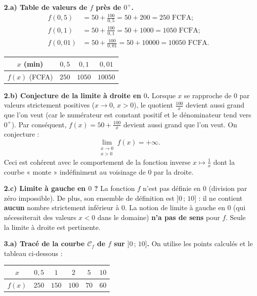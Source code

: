 \documentclass[11pt]{article}
\begin{document}
\begin{exoresolu}
\textbf{2.a) Table de valeurs de $f$ près de $0^+$.}
\begin{align*}
f(0{,}5) &= 50 + \frac{100}{0{,}5} = 50 + 200 = 250 \text{ FCFA} ;\\
f(0{,}1) &= 50 + \frac{100}{0{,}1} = 50 + 1000 = 1050 \text{ FCFA} ;\\
f(0{,}01) &= 50 + \frac{100}{0{,}01} = 50 + 10000 = 10050 \text{ FCFA}.
\end{align*}
\begin{center}
\begin{tabular}{|c|ccc|}\hline
\rowcolor{popblueL} $x$ (min) & $0{,}5$ & $0{,}1$ & $0{,}01$ \\ \hline
$f(x)$ (FCFA) & $250$ & $1050$ & $10050$ \\ \hline
\end{tabular}
\end{center}

\textbf{2.b) Conjecture de la limite à droite en $0$.}
Lorsque $x$ se rapproche de $0$ par valeurs strictement positives ($x \to 0$, $x>0$), le quotient $\frac{100}{x}$ devient aussi grand que l'on veut (car le numérateur est constant positif et le dénominateur tend vers $0^+$). Par conséquent, $f(x) = 50 + \frac{100}{x}$ devient aussi grand que l'on veut. On conjecture :
\[ \lim\limits_{\substack{x \to 0 \\ x > 0}} f(x) = +\infty. \]
Ceci est cohérent avec le comportement de la fonction inverse $x \mapsto \frac{1}{x}$ dont la courbe « monte » indéfiniment au voisinage de $0$ par la droite.

\textbf{2.c) Limite à gauche en $0$ ?}
La fonction $f$ n'est pas définie en $0$ (division par zéro impossible). De plus, son ensemble de définition est $]0\,;\,10]$ : il ne contient \textbf{aucun} nombre strictement inférieur à $0$. La notion de limite à gauche en $0$ (qui nécessiterait des valeurs $x<0$ dans le domaine) \textbf{n'a pas de sens} pour $f$. Seule la limite à droite est pertinente.

\textbf{3.a) Tracé de la courbe $\mathcal{C}_f$ de $f$ sur $]0\,;\,10]$.}
On utilise les points calculés et le tableau ci-dessous :
\begin{center}
\begin{tabular}{|c|ccccc|}\hline
\rowcolor{popblueL} $x$ & $0{,}5$ & $1$ & $2$ & $5$ & $10$ \\ \hline
$f(x)$ & $250$ & $150$ & $100$ & $70$ & $60$ \\ \hline
\end{tabular}
\end{center}


\end{exoresolu}
\end{document}
